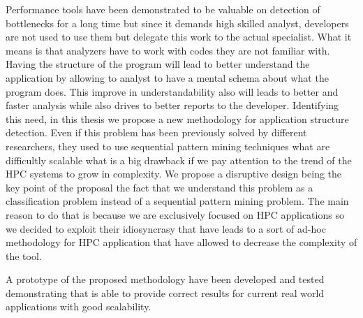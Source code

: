 \documentclass[a4paper,11pt,twoside]{book}
\begin{document}
Performance tools have been demonstrated to be valuable
on detection of bottlenecks for a long time but since it demands high skilled
analyst, developers are not used to use them but delegate this work to the
actual specialist. What it means is that analyzers have to work with codes they
are not familiar with. Having the structure of the program will lead to better
understand the application by allowing to analyst to have a mental schema about
what the program does. This improve in understandability also will leads to
better and faster analysis while also drives to better reports to the developer. 
Identifying this need, in this thesis we propose a new methodology for
application structure detection. Even if this problem has been previously solved by
different researchers, they used to use sequential pattern mining techniques
what are difficultly scalable what is a big drawback if we pay attention to the
trend of the HPC systems to grow in complexity.
We propose a disruptive design being the key point of the proposal the fact that we
understand this problem
as a classification problem instead of a sequential pattern mining problem. The main
reason to do that is because we are exclusively focused on HPC applications so
we decided to exploit their idiosyncrasy that have leads to a sort of ad-hoc
methodology for HPC application that have allowed to decrease the complexity of
the tool.

A prototype of the proposed methodology have been developed and tested
demonstrating that is able to provide correct results for
current real world applications with good scalability.



\tableofcontents
\listoffigures

\mainmatter %
\pagestyle{fancy} %



%




\begin{appendices}
    
\end{appendices}



\end{document}

